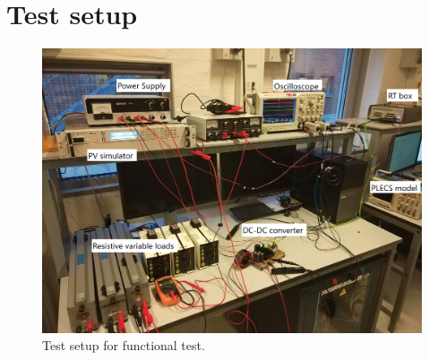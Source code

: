 \chapter{Test setup}

\begin{figure}[H]
	\begin{center}
		\includegraphics[width=1\textwidth]{../Pictures/P1/Appendix/testsetup.png}
		\caption{Test setup for functional test.}
		\label{testsetup}
	\end{center}	
\end{figure}